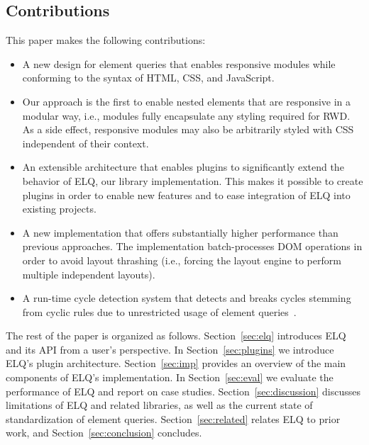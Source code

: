 \documentclass{acm_proc_article-sp}
\newcommand{\elq}{ELQ}
\begin{document}
    \subsection{Contributions}
      This paper makes the following contributions:
      \begin{itemize}
        \item A new design for element queries that enables responsive modules while conforming to the syntax of HTML, CSS, and JavaScript.
        \item
          Our approach is the first to enable nested elements that are responsive in a modular way, i.e., modules fully encapsulate any styling required for RWD.
          As a side effect, responsive modules may also be arbitrarily styled with CSS independent of their context.
        \item
          An extensible architecture that enables plugins to significantly extend the behavior of ELQ, our library implementation.
          This makes it possible to create plugins in order to enable new features and to ease integration of \elq{} into existing projects.
        \item
          A new implementation that offers substantially higher performance than previous approaches.
          The implementation batch-processes DOM operations in order to avoid layout thrashing (i.e., forcing the layout engine to perform multiple independent layouts).
        \item
          A run-time cycle detection system that detects and breaks cycles stemming from cyclic rules due to unrestricted usage of element queries~\cite{elq-thesis}.
      \end{itemize}

    The rest of the paper is organized as follows.
    Section~\ref{sec:elq} introduces \elq{} and its API from a user's perspective.
    In Section~\ref{sec:plugins} we introduce \elq{}'s plugin architecture.
    Section~\ref{sec:imp} provides an overview of the main components of \elq{}'s implementation.
    In Section~\ref{sec:eval} we evaluate the performance of \elq{} and report on case studies.
    Section~\ref{sec:discussion} discusses limitations of \elq{} and related libraries, as well as the current state of standardization of element queries.
    Section~\ref{sec:related} relates \elq{} to prior work, and Section~\ref{sec:conclusion} concludes.
\end{document}
